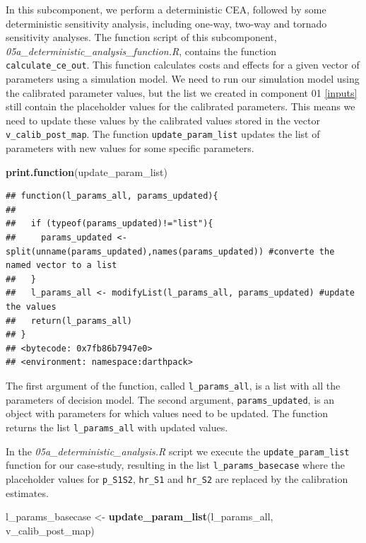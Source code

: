 \documentclass[]{book}
\newenvironment{Shaded}{\begin{snugshade}}{\end{snugshade}}
\newcommand{\KeywordTok}[1]{\textcolor[rgb]{0.13,0.29,0.53}{\textbf{#1}}}
\newcommand{\StringTok}[1]{\textcolor[rgb]{0.31,0.60,0.02}{#1}}
\newcommand{\NormalTok}[1]{#1}
\begin{document}
In this subcomponent, we perform a deterministic CEA, followed by some
deterministic sensitivity analysis, including one-way, two-way and
tornado sensitivity analyses. The function script of this subcomponent,
\emph{05a\_deterministic\_analysis\_function.R}, contains the function
\texttt{calculate\_ce\_out}. This function calculates costs and effects
for a given vector of parameters using a simulation model. We need to
run our simulation model using the calibrated parameter values, but the
list we created in component 01 \ref{inputs} still contain the
placeholder values for the calibrated parameters. This means we need to
update these values by the calibrated values stored in the vector
\texttt{v\_calib\_post\_map}. The function \texttt{update\_param\_list}
updates the list of parameters with new values for some specific
parameters.

\begin{Shaded}
\begin{Highlighting}[]
\KeywordTok{print.function}\NormalTok{(update_param_list)}
\end{Highlighting}
\end{Shaded}

\begin{verbatim}
## function(l_params_all, params_updated){
## 
##   if (typeof(params_updated)!="list"){
##     params_updated <- split(unname(params_updated),names(params_updated)) #converte the named vector to a list
##   }
##   l_params_all <- modifyList(l_params_all, params_updated) #update the values
##   return(l_params_all)
## }
## <bytecode: 0x7fb86b7947e0>
## <environment: namespace:darthpack>
\end{verbatim}

The first argument of the function, called \texttt{l\_params\_all}, is a
list with all the parameters of decision model. The second argument,
\texttt{params\_updated}, is an object with parameters for which values
need to be updated. The function returns the list
\texttt{l\_params\_all} with updated values.

In the \emph{05a\_deterministic\_analysis.R} script we execute the
\texttt{update\_param\_list} function for our case-study, resulting in
the list \texttt{l\_params\_basecase} where the placeholder values for
\texttt{p\_S1S2}, \texttt{hr\_S1} and \texttt{hr\_S2} are replaced by
the calibration estimates.

\begin{Shaded}
\begin{Highlighting}[]
\NormalTok{l_params_basecase <-}\StringTok{ }\KeywordTok{update_param_list}\NormalTok{(l_params_all, v_calib_post_map) }
\end{Highlighting}
\end{Shaded}
\end{document}
